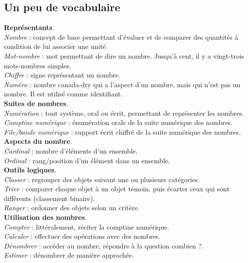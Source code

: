 \bigskip

\subsection{Un peu de vocabulaire}

{\bf Représentants}. \\
   {\it Nombre} : concept de base permettant d'évaluer et de comparer des quantités à condition de lui associer une unité. \\
   {\it Mot-nombre} : mot permettant de dire un nombre. Jusqu'à cent, il y a vingt-trois mots-nombres simples. \\
   {\it Chiffre} : signe représentant un nombre. \\
   {\it Numéro} : nombre \og canada-dry \fg{} qui a l'aspect d'un nombre, mais qui n'est pas un nombre. Il est utilisé comme identifiant.  \\

{\bf Suites de nombres}. \\
   {\it Numération} : tout système, oral ou écrit, permettant de représenter les nombres. \\
   {\it Comptine numérique} : énumération orale de la suite numérique des nombres. \\
   {\it File/bande numérique} : support écrit chiffré de la suite numérique des nombres. \\ 

{\bf Aspects du nombre}. \\
   {\it Cardinal} : nombre d'éléments d'un ensemble.\\
   {\it Ordinal} : rang/position d'un élément dans un ensemble. \\

{\bf Outils logiques}. \\
   {\it Classer} : regrouper des objets suivant une ou plusieurs catégories. \\
   {\it Trier} : comparer chaque objet à un objet témoin, puis écarter ceux qui sont différents (classement binaire). \\
   {\it Ranger} : ordonner des objets selon un critère. \\ 

{\bf Utilisation des nombres}. \\
   {\it Compter} : littéralement, réciter la comptine numérique. \\
   {\it Calculer} : effectuer des opérations avec des nombres. \\
   {\it Dénombrer} : accéder au nombre, répondre à la question \og{}combien ?\fg. \\
   {\it Estimer} : dénombrer de manière approchée.


